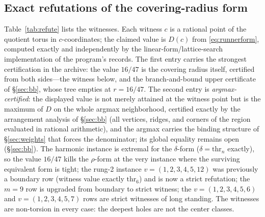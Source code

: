 \documentclass[11pt,a4paper]{article}
\numberwithin{equation}{section}
\theoremstyle{plain}
\theoremstyle{definition}
\theoremstyle{remark}
\begin{document}
\subsection{Exact refutations of the covering-radius form}

Table~\ref{tab:refute} lists the witnesses. Each witness $c$ is a
rational point of the quotient torus in $c$-coordinates; the claimed
value is $D(c)$ from \eqref{eq:runnerform}, computed exactly and
independently by the linear-form/lattice-search implementation of the
program's records. The first entry carries the strongest certification
in the archive: the value $16/47$ is the covering radius itself,
certified from both sides---the witness below, and the branch-and-bound
upper certificate of \S\ref{sec:bb}, whose tree empties at $r=16/47$.
The second entry is \emph{argmax-certified}: the displayed value is
not merely attained at the witness point but is the maximum of $D$ on
the whole argmax neighborhood, certified exactly by the arrangement
analysis of \S\ref{sec:bb} (all vertices, ridges, and corners of the
region evaluated in rational arithmetic), and the argmax carries the
binding structure of \S\ref{sec:weights} that forces the denominator;
its global equality remains open (\S\ref{sec:bb}).
The harmonic instance is extremal for the $\delta$-form
($\delta=\mathrm{thr}_n$ exactly), so the value $16/47$ kills the
$\rho$-form at the very instance where the surviving equivalent form is
tight; the rung-2 instance $v=(1,2,3,4,5,12)$ was previously a
boundary row (witness value exactly $\mathrm{thr}_6$) and is now a
strict refutation; the $m=9$ row is upgraded from boundary to strict
witness; the $v=(1,2,3,4,5,6)$ and $v=(1,2,3,4,5,7)$ rows are strict
witnesses of long standing. The witnesses are non-torsion in every
case: the deepest holes are not the center classes.
\end{document}

